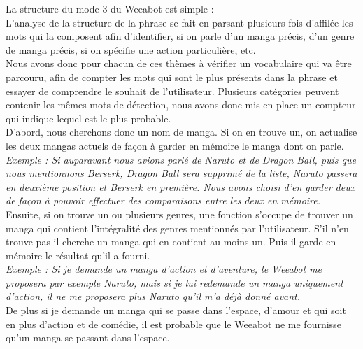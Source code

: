\documentclass[paper=a4, fontsize=11pt]{article}
\begin{document}
La structure du mode 3 du Weeabot est simple :\\

L’analyse de la structure de la phrase se fait en parsant plusieurs fois d’affilée les mots qui la composent afin d’identifier, si on parle d’un manga précis, d’un genre de manga précis, si on spécifie une action particulière, etc.\\
Nous avons donc pour chacun de ces thèmes à vérifier un vocabulaire qui va être parcouru, afin de compter les mots qui sont le plus présents dans la phrase et essayer de comprendre le souhait de l’utilisateur. Plusieurs catégories peuvent contenir les mêmes mots de détection, nous avons donc mis en place un compteur qui indique lequel est le plus probable. \\
D’abord, nous cherchons donc un nom de manga. Si on en trouve un, on actualise les deux mangas actuels de façon à garder en mémoire le manga dont on parle.\\
\textit{Exemple : Si auparavant nous avions parlé de Naruto et de Dragon Ball, puis que nous mentionnons Berserk, Dragon Ball sera supprimé de la liste, Naruto passera en deuxième position et Berserk en première. Nous avons choisi d’en garder deux de façon à pouvoir effectuer des comparaisons entre les deux en mémoire.}\\

Ensuite, si on trouve un ou plusieurs genres, une fonction s’occupe de trouver un manga qui contient l’intégralité des genres mentionnés par l’utilisateur. S’il n’en trouve pas il cherche un manga qui en contient au moins un. Puis il garde en mémoire le résultat qu’il a fourni. \\
\textit{Exemple : Si je demande un manga d’action et d’aventure, le Weeabot me proposera par exemple Naruto, mais si je lui redemande un manga uniquement d’action, il ne me proposera plus Naruto qu’il m’a déjà donné avant.}\\ De plus si je demande un manga qui se passe dans l’espace, d’amour et qui soit en plus d’action et de comédie, il est probable que le Weeabot ne me fournisse qu’un manga se passant dans l’espace. \\
\end{document}
